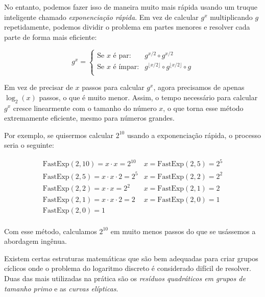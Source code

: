 No entanto, podemos fazer isso de maneira muito mais rápida usando um truque inteligente chamado \textit{exponenciação rápida}.
Em vez de calcular $g^x$ multiplicando $g$ repetidamente, podemos dividir o problema em partes menores e resolver cada parte de forma mais eficiente:

\begin{displaymath}
  g^x = \left\{
    \begin{array}{lcl}
      \text{Se } x \text{ é par:} & g^{x/2} \circ g^{x/2} \\
      \text{Se } x \text{ é ímpar:} & g^{\lfloor x/2 \rfloor} \circ g^{\lfloor x/2 \rfloor} \circ g \\
    \end{array}
  \right.
\end{displaymath}

Em vez de precisar de $x$ passos para calcular $g^x$, agora precisamos de apenas $\log_2(x)$ passos, o que é muito menor.
Assim, o tempo necessário para calcular $g^x$ cresce linearmente com o tamanho do número $x$, o que torna esse método extremamente eficiente, mesmo para números grandes.

Por exemplo, se quisermos calcular $2^{10}$ usando a exponenciação rápida, o processo seria o seguinte:

\begin{displaymath}
  \begin{array}{ll}
    \text{FastExp}(2, 10) = x \cdot x = 2^{10} & x = \text{FastExp}(2, 5) = 2^5 \\
    \text{FastExp}(2, 5)  = x \cdot x \cdot 2 = 2^5 & x = \text{FastExp}(2, 2) = 2^2\\
    \text{FastExp}(2, 2)  = x \cdot x = 2^2 & x = \text{FastExp}(2, 1) = 2\\
    \text{FastExp}(2, 1)  = x \cdot x \cdot 2 = 2 & x = \text{FastExp}(2, 0) = 1\\
    \text{FastExp}(2, 0)  = 1 \\
  \end{array}
\end{displaymath}

Com esse método, calculamos $2^{10}$ em muito menos passos do que se usássemos a abordagem ingênua.

Existem certas estruturas matemáticas que são bem adequadas para criar grupos cíclicos onde o problema do logaritmo discreto é considerado difícil de resolver.
Duas das mais utilizadas na prática são os {\em resíduos quadráticos em grupos de tamanho primo} e as {\em curvas elípticas}.

